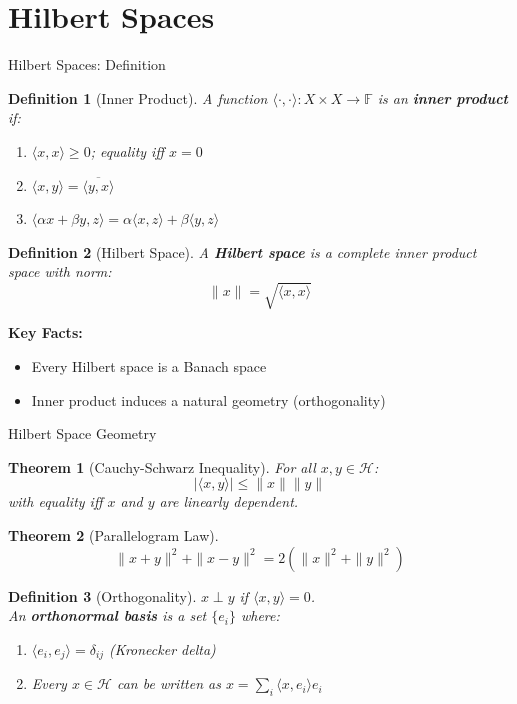 \documentclass[aspectratio=169,10pt]{beamer}
\newtheorem{defn}{Definition}
\newtheorem{thm}{Theorem}
\begin{document}
\section{Hilbert Spaces}

\begin{frame}{Hilbert Spaces: Definition}
  \begin{defn}[Inner Product]
    A function $\langle \cdot, \cdot \rangle: X \times X \to \mathbb{F}$ is an \textbf{inner product} if:
    \begin{enumerate}
      \item $\langle x, x \rangle \geq 0$; equality iff $x = 0$
      \item $\langle x, y \rangle = \overline{\langle y, x \rangle}$
      \item $\langle \alpha x + \beta y, z \rangle = \alpha \langle x, z \rangle + \beta \langle y, z \rangle$
    \end{enumerate}
  \end{defn}

  \vspace{0.3cm}
  \begin{defn}[Hilbert Space]
    A \textbf{Hilbert space} is a complete inner product space with norm:
    \[
    \|x\| = \sqrt{\langle x, x \rangle}
    \]
  \end{defn}

  \vspace{0.3cm}
  \textbf{Key Facts:}
  \begin{itemize}
    \item Every Hilbert space is a Banach space
    \item Inner product induces a natural geometry (orthogonality)
  \end{itemize}
\end{frame}

\begin{frame}{Hilbert Space Geometry}
  \begin{thm}[Cauchy-Schwarz Inequality]
    For all $x, y \in \mathcal{H}$:
    \[
    |\langle x, y \rangle| \leq \|x\| \|y\|
    \]
    with equality iff $x$ and $y$ are linearly dependent.
  \end{thm}

  \vspace{0.3cm}
  \begin{thm}[Parallelogram Law]
    \[
    \|x + y\|^2 + \|x - y\|^2 = 2(\|x\|^2 + \|y\|^2)
    \]
  \end{thm}

  \vspace{0.3cm}
  \begin{defn}[Orthogonality]
    $x \perp y$ if $\langle x, y \rangle = 0$. \\
    An \textbf{orthonormal basis} is a set $\{e_i\}$ where:
    \begin{enumerate}
      \item $\langle e_i, e_j \rangle = \delta_{ij}$ (Kronecker delta)
      \item Every $x \in \mathcal{H}$ can be written as $x = \sum_i \langle x, e_i \rangle e_i$
    \end{enumerate}
  \end{defn}
\end{frame}
\end{document}

